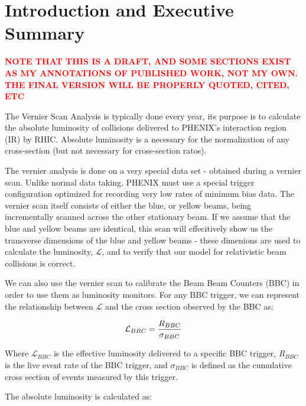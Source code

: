 \pagestyle{empty}


\clearpage

\pagestyle{fancy}

\chapter{Introduction and Executive Summary}
\label{ch:intro}

\textcolor{red}{\textbf{NOTE THAT THIS IS A DRAFT, AND SOME SECTIONS EXIST AS MY
ANNOTATIONS OF PUBLISHED WORK, NOT MY OWN. THE FINAL VERSION WILL BE PROPERLY
QUOTED, CITED, ETC}}

The Vernier Scan Analysis is typically done every year, its purpose is to
calculate the absolute luminosity of collisions delivered to PHENIX's
interaction region (IR) by RHIC.  Absolute luminosity is a necessary for the
normalization of any cross-section (but not necessary for cross-section ratos).  

The vernier analysis is done on a very special data set - obtained during a
vernier scan.  Unlike normal data taking, PHENIX must use a special trigger
configuration optimized for recording very low rates of minimum bias data. The
vernier scan itself consists of either the blue, or yellow beams, being
incrementally scanned across the other stationary beam.  If we assume that the
blue and yellow beams are identical, this scan will effecitively show us the
transverse dimensions of the blue and yellow beams - these dimenions are used to
calculate the luminosity, $\mathcal{L}$, and to verify that our model for
relativistic beam collisions is correct.

We can also use the vernier scan to calibrate the Beam Beam Counters (BBC) in
order to use them as luminosity monitors. For any BBC trigger, we can represent
the relationship between $\mathcal{L}$ and the cross section observed by the BBC
as:

\begin{equation} 
\label{eq:lumi_xsec_simple} 
\mathcal{L}_{BBC} = {R_{BBC}\over\sigma_{BBC}} 
\end{equation}

Where $\mathcal{L}_{BBC}$ is the effective luminosity delivered to a specific
BBC trigger, $R_{BBC}$ is the live event rate of the BBC trigger, and
$\sigma_{BBC}$ is defined as the cumulative cross section of events measured by
this trigger.

The absolute luminosity is calculated as:

